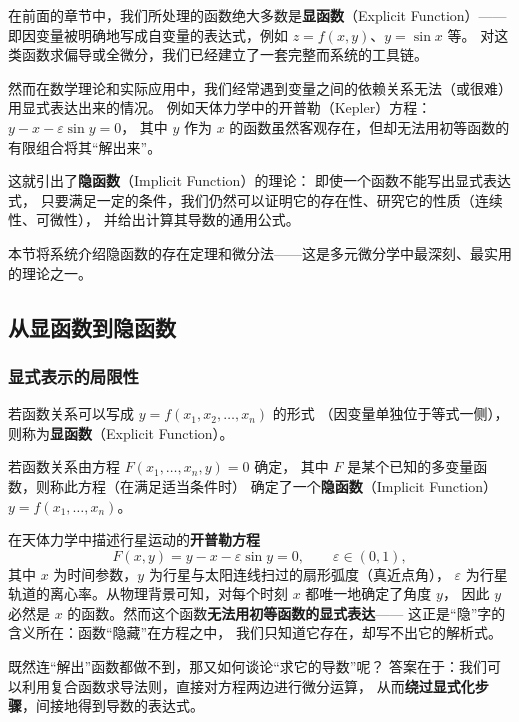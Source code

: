 \documentclass[lang=cn,11pt]{elegantbook}
\begin{document}
在前面的章节中，我们所处理的函数绝大多数是\textbf{显函数}（Explicit Function）——
即因变量被明确地写成自变量的表达式，例如 $z=f(x,y)$、$y=\sin x$ 等。
对这类函数求偏导或全微分，我们已经建立了一套完整而系统的工具链。

然而在数学理论和实际应用中，我们经常遇到变量之间的依赖关系无法（或很难）用显式表达出来的情况。
例如天体力学中的开普勒（Kepler）方程：
$y-x-\varepsilon\sin y=0$，
其中 $y$ 作为 $x$ 的函数虽然客观存在，但却无法用初等函数的有限组合将其“解出来”。

这就引出了\textbf{隐函数}（Implicit Function）的理论：
即使一个函数不能写出显式表达式，
只要满足一定的条件，我们仍然可以证明它的存在性、研究它的性质（连续性、可微性），
并给出计算其导数的通用公式。

本节将系统介绍隐函数的存在定理和微分法——这是多元微分学中最深刻、最实用的理论之一。


\subsection{从显函数到隐函数}

\subsubsection{显式表示的局限性}

\begin{definition}[显函数与隐函数] \label{def:explicit-implicit}
若函数关系可以写成 $y=f(x_1,x_2,\dots,x_n)$ 的形式
（因变量单独位于等式一侧），则称为\textbf{显函数}（Explicit Function）。

若函数关系由方程 $F(x_1,\dots,x_n,y)=0$ 确定，
其中 $F$ 是某个已知的多变量函数，则称此方程（在满足适当条件时）
确定了一个\textbf{隐函数}（Implicit Function）$y=f(x_1,\dots,x_n)$。
\end{definition}

\begin{note} \label{note:kepler-eq}
在天体力学中描述行星运动的\textbf{开普勒方程}
\[
F(x,y)=y-x-\varepsilon\sin y=0,\qquad\varepsilon\in(0,1),
\]
其中 $x$ 为时间参数，$y$ 为行星与太阳连线扫过的扇形弧度（真近点角），
$\varepsilon$ 为行星轨道的离心率。从物理背景可知，对每个时刻 $x$ 都唯一地确定了角度 $y$，
因此 $y$ 必然是 $x$ 的函数。然而这个函数\textbf{无法用初等函数的显式表达}——
这正是“隐”字的含义所在：函数“隐藏”在方程之中，
我们只知道它存在，却写不出它的解析式。
\end{note}

既然连“解出”函数都做不到，那又如何谈论“求它的导数”呢？
答案在于：我们可以利用复合函数求导法则，直接对方程两边进行微分运算，
从而\textbf{绕过显式化步骤}，间接地得到导数的表达式。
\end{document}
